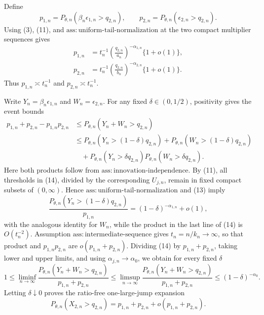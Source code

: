 Define
\[
p_{1,n}=P_{\theta,n}(\beta_n\epsilon_{1,n}>q_{2,n}),
\qquad
p_{2,n}=P_{\theta,n}(\epsilon_{2,n}>q_{2,n}).
\tag{12}
\]
Using (3), (11), and \(\mathrm{ass{:}uniform\text{-}tail\text{-}normalization}\) at the two compact multiplier sequences gives
\[
\begin{split}
p_{1,n}
&=t_n^{-1}\left(\frac{q_{2,n}}{a_n}\right)^{-\alpha_{1,n}}\{1+o(1)\},\\
p_{2,n}
&=t_n^{-1}\left(\frac{q_{2,n}}{b_n}\right)^{-\alpha_{2,n}}\{1+o(1)\}.
\end{split}
\tag{13}
\]
Thus \(p_{1,n}\asymp t_n^{-1}\) and \(p_{2,n}\asymp t_n^{-1}\).

Write \(Y_n=\beta_n\epsilon_{1,n}\) and \(W_n=\epsilon_{2,n}\). For any fixed \(\delta\in(0,1/2)\), positivity gives the event bounds
\[
\begin{split}
p_{1,n}+p_{2,n}-p_{1,n}p_{2,n}
&\leq P_{\theta,n}(Y_n+W_n>q_{2,n})\\
&\leq P_{\theta,n}(Y_n>(1-\delta)q_{2,n})
+P_{\theta,n}(W_n>(1-\delta)q_{2,n})\\
&\quad+P_{\theta,n}(Y_n>\delta q_{2,n})
P_{\theta,n}(W_n>\delta q_{2,n}).
\end{split}
\tag{14}
\]
Here both products follow from \(\mathrm{ass{:}innovation\text{-}independence}\). By (11), all thresholds in (14), divided by the corresponding \(U_{j,n}\), remain in fixed compact subsets of \((0,\infty)\). Hence \(\mathrm{ass{:}uniform\text{-}tail\text{-}normalization}\) and (13) imply
\[
\frac{P_{\theta,n}(Y_n>(1-\delta)q_{2,n})}{p_{1,n}}
=(1-\delta)^{-\alpha_{1,n}}+o(1),
\tag{15}
\]
with the analogous identity for \(W_n\), while the product in the last line of (14) is \(O(t_n^{-2})\). Assumption \(\mathrm{ass{:}intermediate\text{-}sequence}\) gives \(t_n=n/k_n\to\infty\), so that product and \(p_{1,n}p_{2,n}\) are \(o(p_{1,n}+p_{2,n})\). Dividing (14) by \(p_{1,n}+p_{2,n}\), taking lower and upper limits, and using \(\alpha_{j,n}\to\alpha_0\), we obtain for every fixed \(\delta\)
\[
1\leq\liminf_{n\to\infty}
\frac{P_{\theta,n}(Y_n+W_n>q_{2,n})}{p_{1,n}+p_{2,n}}
\leq\limsup_{n\to\infty}
\frac{P_{\theta,n}(Y_n+W_n>q_{2,n})}{p_{1,n}+p_{2,n}}
\leq(1-\delta)^{-\alpha_0}.
\]
Letting \(\delta\downarrow0\) proves the ratio-free one-large-jump expansion
\[
P_{\theta,n}(X_{2,n}>q_{2,n})
=p_{1,n}+p_{2,n}+o(p_{1,n}+p_{2,n}).
\tag{16}
\]

